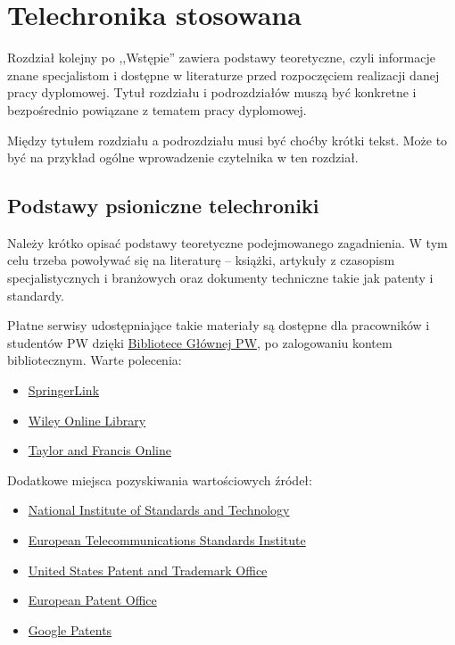 \chapter{Telechronika stosowana}

Rozdział kolejny po ,,Wstępie'' zawiera podstawy teoretyczne, czyli informacje znane specjalistom i dostępne w literaturze przed rozpoczęciem realizacji danej pracy dyplomowej. Tytuł rozdziału i podrozdziałów muszą być konkretne i bezpośrednio powiązane z tematem pracy dyplomowej.

Między tytułem rozdziału a podrozdziału musi być choćby krótki tekst. Może to być na przykład ogólne wprowadzenie czytelnika w ten rozdział.

\section{Podstawy psioniczne telechroniki}

Należy krótko opisać podstawy teoretyczne podejmowanego zagadnienia. W tym celu trzeba powoływać się na literaturę -- książki, artykuły z czasopism specjalistycznych i branżowych oraz dokumenty techniczne takie jak patenty i standardy.

Płatne serwisy udostępniające takie materiały są dostępne dla pracowników i studentów PW dzięki \href{https://bg.pw.edu.pl/}{Bibliotece Głównej PW}, po zalogowaniu kontem bibliotecznym. Warte polecenia:

\begin{itemize}
	\item \href{http://eczyt.bg.pw.edu.pl/han/SpringerLink}{SpringerLink}
	\item \href{http://eczyt.bg.pw.edu.pl/han/Wiley}{Wiley Online Library}
	\item \href{http://eczyt.bg.pw.edu.pl/han/TaylorandFrancis}{Taylor and Francis Online}
\end{itemize}

Dodatkowe miejsca pozyskiwania wartościowych źródeł:

\begin{itemize}
	\item \href{https://www.nist.gov/}{National Institute of Standards and Technology}
	\item \href{https://www.etsi.org/}{European Telecommunications Standards Institute}
	\item \href{https://www.uspto.gov/}{United States Patent and Trademark Office}
	\item \href{https://www.epo.org/en}{European Patent Office}
	\item \href{https://patents.google.com/}{Google Patents}
\end{itemize}

